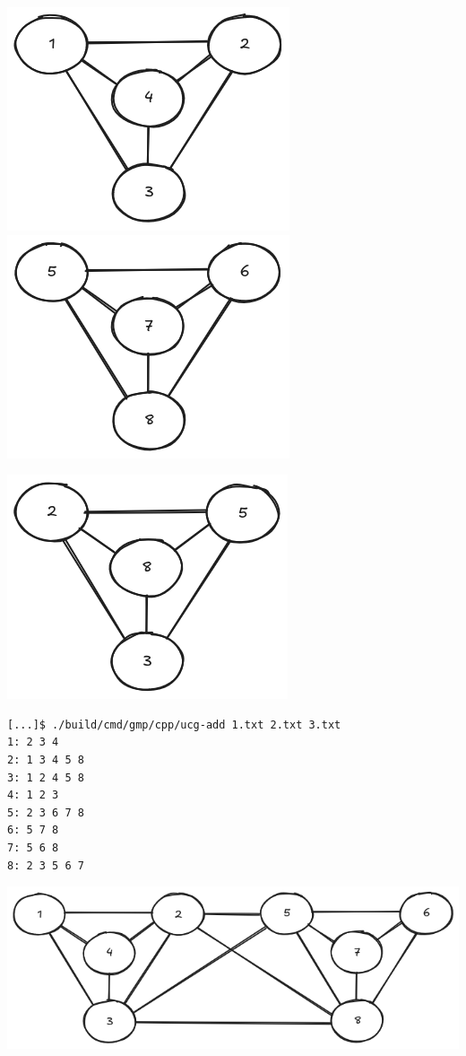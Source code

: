 \documentclass[12pt, a4paper]{article}
\begin{document}
\vspace{5mm}

\begin{center}
\begin{multicols}{2}
\includegraphics[scale=0.5]{6.png}
\columnbreak
\includegraphics[scale=0.5]{7.png}
\end{multicols}
\end{center}

\begin{center}
\includegraphics[scale=0.5]{9.png}
\end{center}

\vspace{5mm}

\begin{verbatim}
[...]$ ./build/cmd/gmp/cpp/ucg-add 1.txt 2.txt 3.txt
1: 2 3 4 
2: 1 3 4 5 8 
3: 1 2 4 5 8 
4: 1 2 3 
5: 2 3 6 7 8 
6: 5 7 8 
7: 5 6 8 
8: 2 3 5 6 7
\end{verbatim}

\vspace{5mm}

\begin{center}
\includegraphics[scale=0.5]{8.png}
\end{center}
\end{document}
